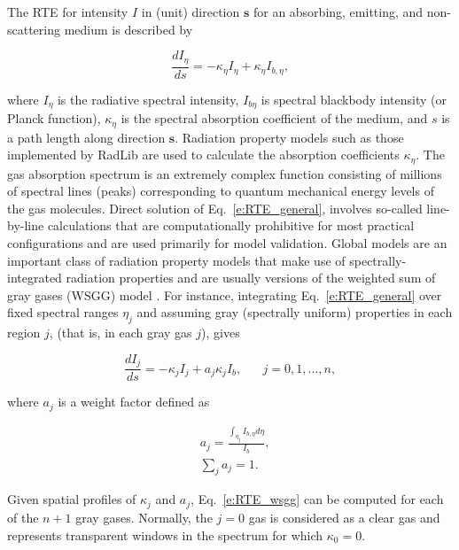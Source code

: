 \documentclass[preprint,12pt, a4paper]{elsarticle}
\begin{document}
The RTE for intensity $I$ in (unit) direction $\mathbf{s}$ for an absorbing, emitting, and non-scattering medium is described by
% 
\begin{linenomath}
\begin{equation} \label{e:RTE_general}
    \frac{dI_{\eta}}{ds} = -\kappa_{\eta}I_{\eta} + \kappa_{\eta}I_{b,\eta},
\end{equation}
\end{linenomath}
%
where $I_{\eta}$ is the radiative spectral intensity, 
$I_{b\eta}$ is spectral blackbody intensity (or Planck function), 
$\kappa_{\eta}$ is the spectral absorption coefficient of the medium, and $s$ is a path length along direction $\mathbf{s}$. Radiation property models such as those implemented by RadLib are used to calculate the absorption coefficients $\kappa_{\eta}$. 
%
The gas absorption spectrum is an extremely complex function consisting of millions of spectral lines (peaks) corresponding to quantum mechanical energy levels of the gas molecules.
Direct solution of Eq.~\ref{e:RTE_general}, involves so-called line-by-line calculations that are computationally prohibitive for most practical configurations and are used primarily for model validation. Global models are an important class of radiation property models that make use of spectrally-integrated radiation properties and are usually versions of the weighted sum of gray gases (WSGG) model \cite{Hottel_1967,Modest_2013}. For instance, integrating Eq.~\ref{e:RTE_general} over fixed spectral ranges $\eta_j$ and assuming gray (spectrally uniform) properties in each region $j$, (that is, in each gray gas $j$), gives
%
\begin{linenomath}
\begin{equation} \label{e:RTE_wsgg}
	\frac{dI_j}{ds} = -\kappa_jI_j + a_j\kappa_jI_b, \hspace{20pt} j=0,1,...,n,
\end{equation}
\end{linenomath}
%
where $a_j$ is a weight factor defined as
%
\begin{linenomath}
\begin{align}
    &a_j= \frac{\int_{\eta_j}I_{b,\eta}d\eta}{I_b},\\
    &\sum_j a_j = 1.
\end{align}
\end{linenomath}
%
Given spatial profiles of $\kappa_j$ and $a_j$, Eq.~\ref{e:RTE_wsgg} can be computed for each of the $n+1$ gray gases. Normally, the $j=0$ gas is considered as a clear gas and represents transparent windows in the spectrum for which $\kappa_0=0$.
\end{document}
